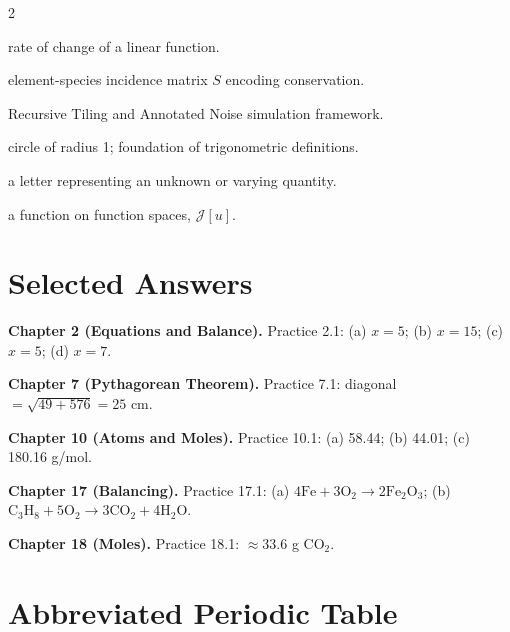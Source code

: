 \documentclass[11pt, openany]{book}
\theoremstyle{plain}
\theoremstyle{definition}
\theoremstyle{remark}
\begin{document}
\begin{multicols}{2}
\begin{description}[labelindent=0pt,leftmargin=0.8em,style=nextline]
\item[Slope] rate of change of a linear function.
\item[Stoichiometric matrix] element-species incidence matrix $S$ encoding conservation.
\item[TARTAN] Recursive Tiling and Annotated Noise simulation framework.
\item[Unit circle] circle of radius 1; foundation of trigonometric definitions.
\item[Variable] a letter representing an unknown or varying quantity.
\item[Variational functional] a function on function spaces, $\mathcal{J}[u]$.
\end{description}
\end{multicols}

\chapter*{Selected Answers}

\textbf{Chapter 2 (Equations and Balance).}
Practice 2.1: (a) $x=5$; (b) $x=15$; (c) $x=5$; (d) $x=7$.

\textbf{Chapter 7 (Pythagorean Theorem).}
Practice 7.1: diagonal $=\sqrt{49+576}=25$ cm.

\textbf{Chapter 10 (Atoms and Moles).}
Practice 10.1: (a) 58.44; (b) 44.01; (c) 180.16 g/mol.

\textbf{Chapter 17 (Balancing).}
Practice 17.1: (a) $4\mathrm{Fe}+3\mathrm{O_2}\to2\mathrm{Fe_2O_3}$;
(b) $\mathrm{C_3H_8}+5\mathrm{O_2}\to3\mathrm{CO_2}+4\mathrm{H_2O}$.

\textbf{Chapter 18 (Moles).}
Practice 18.1: $\approx33.6$ g CO$_2$.

\chapter*{Abbreviated Periodic Table}
\end{document}
